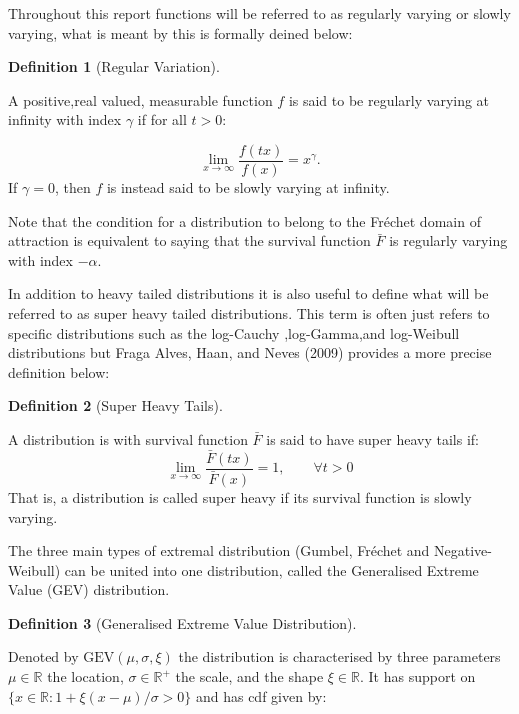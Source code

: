 \documentclass[
  10pt,
  a4paper,
]{scrreprt}
\theoremstyle{plain}
\theoremstyle{plain}
\theoremstyle{definition}
\newtheorem{definition}{Definition}[section]
\theoremstyle{plain}
\theoremstyle{remark}
\begin{document}
{Throughout this report functions will be referred to as regularly
varying or slowly varying, what is meant by this is formally deined
below:

\begin{definition}[Regular
Variation]\protect\hypertarget{def-rv}{}\label{def-rv}

A positive,real valued, measurable function \(f\) is said to be
regularly varying at infinity with index \(\gamma\) if for all \(t>0\):

\[
\lim_{x\rightarrow\infty}\displaystyle\frac{f(tx)}{f(x)} = x^{\gamma}.
\] If \(\gamma =0\), then \(f\) is instead said to be slowly varying at
infinity.

\end{definition}

Note that the condition for a distribution to belong to the Fréchet
domain of attraction is equivalent to saying that the survival function
\(\bar F\) is regularly varying with index \(-\alpha\).

In addition to heavy tailed distributions it is also useful to define
what will be referred to as super heavy tailed distributions. This term
is often just refers to specific distributions such as the log-Cauchy
,log-Gamma,and log-Weibull distributions but Fraga Alves, Haan, and
Neves (2009) provides a more precise definition below:

\begin{definition}[Super Heavy
Tails]\protect\hypertarget{def-sup}{}\label{def-sup}

A distribution is with survival function \(\bar F\) is said to have
super heavy tails if: \[
\lim_{x\rightarrow\infty}\displaystyle\frac{\bar F(tx)}{\bar F (x)} = 1,\qquad \forall t>0
\] That is, a distribution is called super heavy if its survival
function is slowly varying.

\end{definition}

The three main types of extremal distribution (Gumbel, Fréchet and
Negative-Weibull) can be united into one distribution, called the
Generalised Extreme Value (GEV) distribution.

\begin{definition}[Generalised Extreme Value
Distribution]\protect\hypertarget{def-gev}{}\label{def-gev}

Denoted by \(\text{GEV}(\mu,\sigma,\xi)\) the distribution is
characterised by three parameters \(\mu \in \mathbb R\) the location,
\(\sigma\in \mathbb R^+\) the scale, and the shape \(\xi\in \mathbb R\).
It has support on \(\{x\in \mathbb R:1+\xi(x-\mu)/\sigma > 0\}\) and has
cdf given by:


\end{definition}}
\end{document}
